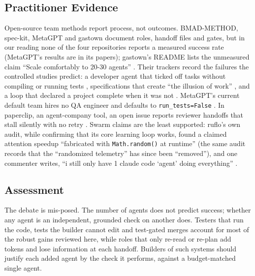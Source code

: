 \subsection{Practitioner Evidence}

\begin{sloppypar}
Open-source team methods report process, not outcomes. BMAD-METHOD, spec-kit, MetaGPT and gastown document roles, handoff files and gates, but in our reading none of the four repositories reports a measured success rate (MetaGPT's results are in its papers); gastown's README lists the unmeasured claim ``Scale comfortably to 20-30 agents'' . Their trackers record the failures the controlled studies predict: a developer agent that ticked off tasks without compiling or running tests , specifications that create ``the illusion of work'' , and a loop that declared a project complete when it was not . MetaGPT's current default team hires no QA engineer and defaults to \texttt{run\_tests=False} . In paperclip, an agent-company tool, an open issue reports reviewer handoffs that stall silently with no retry . Swarm claims are the least supported: ruflo's own audit, while confirming that its core learning loop works, found a claimed attention speedup ``fabricated with \texttt{Math.random()} at runtime''  (the same audit records that the ``randomized telemetry'' has since been ``removed''), and one commenter writes, ``i still only have 1 claude code `agent' doing everything'' .
\end{sloppypar}

\subsection{Assessment}

The debate is mis-posed. The number of agents does not predict success; whether any agent is an independent, grounded check on another does. Testers that run the code, tests the builder cannot edit and test-gated merges account for most of the robust gains reviewed here, while roles that only re-read or re-plan add tokens and lose information at each handoff. Builders of such systems should justify each added agent by the check it performs, against a budget-matched single agent.
